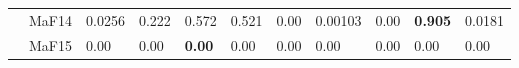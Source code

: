 \documentclass[]{article}
\begin{document}
\begin{landscape}
\begin{table}
\begin{footnotesize}
\begin{tabular}{|l|l|l|l|l|l|l|l|l|l|l|}
 & MaF14 & 0.0256 & 0.222 & \cellcolor{gray95} 0.572 & \cellcolor{gray95} 0.521 & 0.00 & 0.00103 & 0.00 & \cellcolor{gray95} {\bf 0.905} & 0.0181\\
 & MaF15 & \cellcolor{gray95} 0.00 & \cellcolor{gray95} 0.00 & \cellcolor{gray95} {\bf 0.00} & \cellcolor{gray95} 0.00 & \cellcolor{gray95} 0.00 & \cellcolor{gray95} 0.00 & \cellcolor{gray95} 0.00 & \cellcolor{gray95} 0.00 & \cellcolor{gray95} 0.00\\
\hline
\end{tabular}
\end{footnotesize}
\end{table}
\end{landscape}
\end{document}
